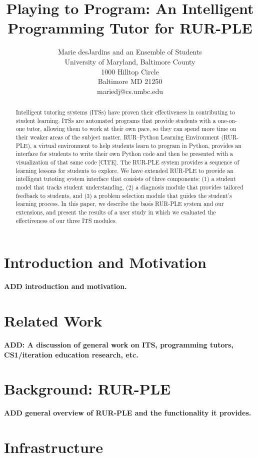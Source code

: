 \documentclass[twocolumn]{article}
\title{Playing to Program:  An Intelligent Programming Tutor for RUR-PLE}
\author{Marie desJardins and an Ensemble of Students \\
University of Maryland, Baltimore County \\ 
1000 Hilltop Circle \\
Baltimore MD  21250 \\
mariedj@cs.umbc.edu
}
\newcommand{\fix}[1]{{\bf #1}}
\begin{document}
\maketitle

\begin{abstract}
Intelligent tutoring systems (ITSs) have proven their effectiveness in
contributing to student learning.  ITSs are automated programs
that provide students with a one-on-one tutor, allowing them to work
at their own pace, so they can spend more time on their weaker areas
of the subject matter.  RUR--Python Learning Environment (RUR-PLE), a
virtual environment to help 
students learn to program in Python, provides an interface for
students to write their own Python code and then be presented with a
visualization of that same code [CITE].  
The RUR-PLE system provides a sequence of learning lessons for
students to explore.  We have extended RUR-PLE to provide an
intelligent tutoting system interface that consists of three
components:  (1) a
student model that tracks student understanding, (2) a diagnosis module
that provides tailored feedback to students, and (3) a problem selection
module that guides the student's learning process.  In this paper, we
describe the basis RUR-PLE system and our extensions, and present the
results of a user study in which we evaluated the effectiveness of our
three ITS modules.
\end{abstract}

\section{Introduction and Motivation}
\label{sec:intro}

\fix{ADD introduction and motivation.}

\section{Related Work}
\label{sec:related-work}

\fix{ADD: A discussion of general work on ITS, programming tutors,
CS1/iteration education research, etc.}

\section{Background: RUR-PLE}
\label{sec:background}

\fix{ADD general overview of RUR-PLE and the functionality
it provides.}

\section{Infrastructure}
\label{sec:student-model}
\end{document}
